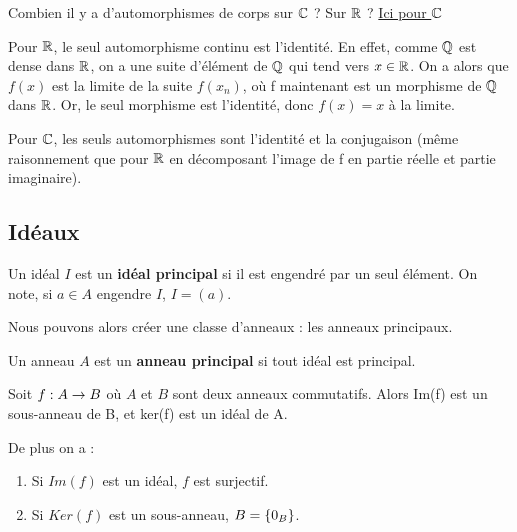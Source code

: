\begin{question}
	Combien il y a d'automorphismes de corps sur $\mathbb{C}$ ? Sur $\mathbb{R}$ ?
	\href{http://www.math.uga.edu/~pete/Kestelman51.pdf}{Ici pour $\mathbb{C}$}

	Pour $\mathbb{R}$, le seul automorphisme continu est l'identité. En effet, comme
	$\mathbb{Q}$ est dense dans $\mathbb{R}$, on a une suite d'élément de $\mathbb{Q}$
	qui tend vers $x \in \mathbb{R}$. On a alors que $f(x)$ est la limite de la suite
	$f(x_{n})$, où f maintenant est un morphisme de $\mathbb{Q}$ dans $\mathbb{R}$.
	Or, le seul morphisme est l'identité, donc $f(x) = x$ à la limite.

	Pour $\mathbb{C}$, les seuls automorphismes sont l'identité et la conjugaison
	(même raisonnement que pour $\mathbb{R}$ en décomposant l'image de f en partie
	réelle et partie imaginaire).
\end{question}

\subsection{Idéaux}

\begin{definition} [Idéal]

	\label{ideal}
\end{definition}

\begin{definition} 
	Un idéal $I$ est un \textbf{idéal principal} si il est engendré par un seul
	élément. On note, si $a \in A$ engendre $I$, $I = (a)$.
	\label{principal_ideal}
\end{definition}

Nous pouvons alors créer une classe d'anneaux : les anneaux principaux.

\begin{definition} 
	Un anneau $A$ est un \textbf{anneau principal} si tout idéal est principal.
	\label{principal_ring}
\end{definition}

\begin{exemple}

\end{exemple}

\begin{proposition}
	Soit $f : A \rightarrow B$ où $A$ et $B$ sont deux anneaux commutatifs. Alors
	Im(f) est un sous-anneau de B, et ker(f) est un idéal de A.

	De plus on a :
	\begin{enumerate}
		\item Si $Im(f)$ est un idéal, $f$ est surjectif.
		\item Si $Ker(f)$ est un sous-anneau, $B = \left\{0_{B} \right\}$.
	\end{enumerate}
\end{proposition}


